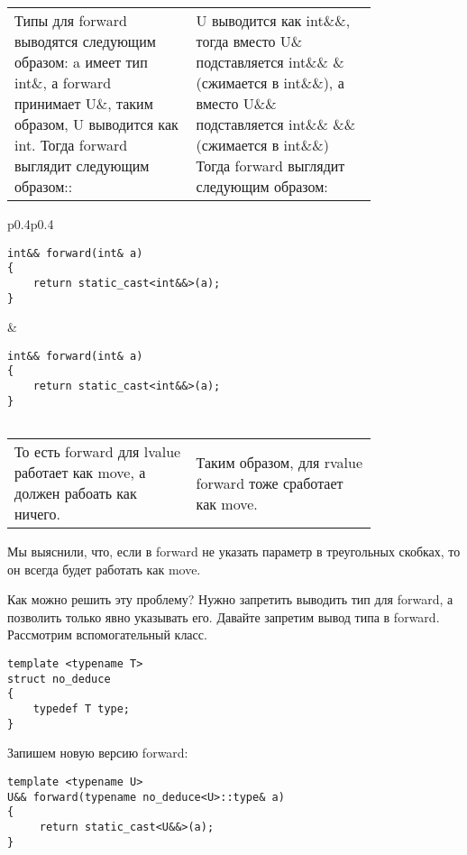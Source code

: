 \begin{center}
\begin{tabular}{p{0.4\linewidth}p{0.4\linewidth}}
Типы для forward выводятся следующим образом:
a имеет тип int\&, а forward принимает U\&, таким образом, U выводится как int. Тогда forward выглядит следующим образом::
 & U выводится как int\&\&, тогда вместо U\& подставляется int\&\& \& (сжимается в int\&\&), а вместо U\&\& подставляется int\&\& \&\& (сжимается в int\&\&) Тогда forward выглядит следующим образом:
\\
\end{tabular}

\begin{tabular}{p{0.4\linewidth}p{0.4\linewidth}}
\begin{verbatim}
int&& forward(int& a)
{
    return static_cast<int&&>(a);
}

\end{verbatim}
 & \begin{verbatim}
int&& forward(int& a)
{
    return static_cast<int&&>(a);
}


\end{verbatim}
\end{tabular}

\begin{tabular}{p{0.4\linewidth}p{0.4\linewidth}}
То есть forward для lvalue работает как move, а должен рабоать как ничего. & Таким образом, для rvalue forward тоже сработает как move.\\
\end{tabular}

\end{center}

	Мы выяснили, что, если в forward не указать параметр в треугольных скобках, то он всегда будет работать как move.

	Как можно решить эту проблему? Нужно запретить выводить тип для forward, а позволить только явно указывать его. Давайте запретим вывод типа в forward. Рассмотрим вспомогательный класс.

\begin{verbatim}
template <typename T>
struct no_deduce
{
    typedef T type;
}
\end{verbatim}

	Запишем новую версию forward:

\begin{verbatim}
template <typename U>
U&& forward(typename no_deduce<U>::type& a)
{
     return static_cast<U&&>(a);
}
\end{verbatim}

